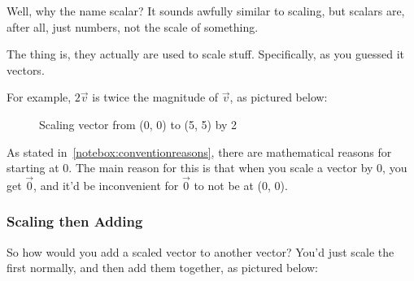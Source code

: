 \documentclass[12pt]{article}
\begin{document}
Well, why the name scalar? It sounds awfully similar to scaling, but scalars are, after all, just numbers, not the scale of something.

The thing is, they actually are used to scale stuff. Specifically, as you guessed it vectors.

For example, $2\vec{v}$ is twice the magnitude of $\vec{v}$, as pictured below:

\begin{figure}[H]
    \centering
    \caption{Scaling vector from (0, 0) to (5, 5) by 2}
\end{figure}

\begin{notebox}
    As stated in~\ref{notebox:conventionreasons}, there are mathematical reasons for starting at 0. The main reason for this is that when you scale a vector by 0, you get $\vec{0}$, and it'd be inconvenient for $\vec{0}$ to not be at (0, 0).
\end{notebox}

\subsubsection{Scaling then Adding}

So how would you add a scaled vector to another vector? You'd just scale the first normally, and then add them together, as pictured below:
\end{document}
